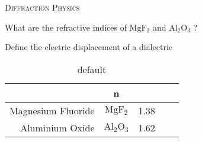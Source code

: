 \documentclass{article}
\newenvironment{flashcard}[2][\parskipfill]{%
\noindent   \textsc{#1}

\vfill
\centerline{{\Large{#2}}}
\vfill
\newpage
}
{\newpage}
\begin{document}

\begin{flashcard}[Diffraction Physics]{What are the refractive indices of $\mathrm{Mg F_{2}}$ and $\mathrm{Al_{2}O_{3}}$ ?}
Define the electric displacement of a dialectric

\begin{table}[htdp]
\caption{default}
\begin{tabular}{| r | c | r | c | r |}
 & n  \\
\hline
Magnesium Fluoride & $\mathrm{Mg F_{2}}$ & 1.38 \\
Aluminium Oxide & $\mathrm{Al_{2}O_{3}}$ & 1.62 \\
\hline

\end{tabular}
\label{default}
\end{table}%


\end{flashcard}
\end{document}
